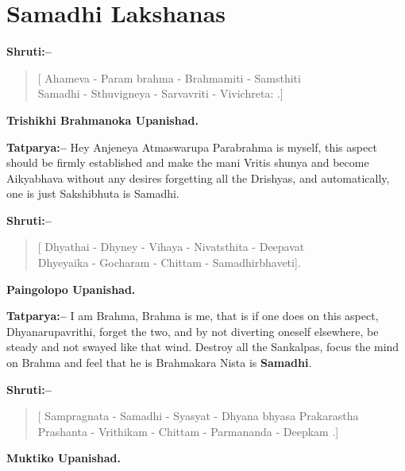 \chapter{Samadhi Lakshanas}

\textbf{Shruti:–}

\begin{verse}
[ Ahameva - Param brahma - Brahmamiti - Samsthiti \\ Samadhi - Sthuvigneya - Sarvavriti - Vivichreta: .]
\end{verse}

\begin{flushright}
\textbf{Trishikhi Brahmanoka Upanishad.}
\end{flushright}

\textbf{Tatparya:–} Hey Anjeneya Atmaswarupa Parabrahma is myself, this aspect should be firmly established and make the mani Vritis shunya and become Aikyabhava without any desires forgetting all the Drishyas, and automatically, one is just Sakshibhuta is Samadhi.

\textbf{Shruti:–}

\begin{verse}
[ Dhyathai - Dhyney - Vihaya - Nivatsthita - Deepavat \\ Dhyeyaika - Gocharam - Chittam - Samadhirbhaveti].
\end{verse}

\begin{flushright}
\textbf{Paingolopo Upanishad.}
\end{flushright}

\textbf{Tatparya:–} I am Brahma, Brahma is me, that is if one does  on this aspect, Dhyanarupavrithi, forget the two, and by not diverting oneself elsewhere, be steady and not swayed like that wind. Destroy all the Sankalpas, focus the mind on Brahma and feel that he is Brahmakara Nista is \textbf{Samadhi}.

\newpage

\textbf{Shruti:–}

\begin{verse}
[ Sampragnata - Samadhi - Syasyat - Dhyana bhyasa Praka\break rastha Prashanta - Vrithikam - Chittam - Parmananda - Deepkam .]
\end{verse}

\begin{flushright}
\textbf{Muktiko Upanishad.}
\end{flushright}

